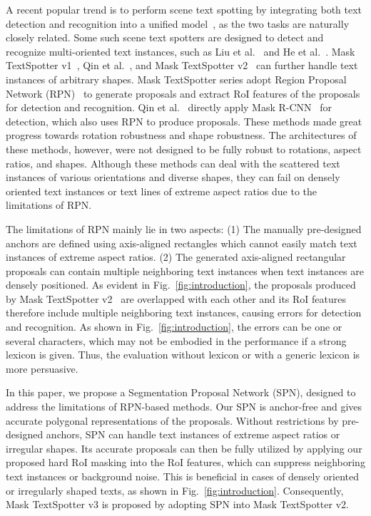 \documentclass[runningheads]{llncs}
\begin{document}
A recent popular trend is to perform scene text spotting by integrating both text detection and recognition into a unified model~\cite{Busta_2017_ICCV,Li_2017_ICCV}, as the two tasks are naturally closely related. Some such scene text spotters are designed to detect and recognize multi-oriented text instances, such as Liu et al.~\cite{liu2018fots} and He et al.~\cite{he2018end}. Mask TextSpotter v1~\cite{LyuLYWB18}, Qin et al.~\cite{qin2019towards}, and Mask TextSpotter v2~\cite{liao2019mask} can further handle text instances of arbitrary shapes. Mask TextSpotter series adopt Region Proposal Network (RPN)~\cite{ren2015faster} to generate proposals and extract RoI features of the proposals for detection and recognition. Qin et al.~\cite{qin2019towards} directly apply Mask R-CNN~\cite{he2017mask} for detection, which also uses RPN to produce proposals. 
These methods made great progress towards rotation robustness and shape robustness. The architectures of these methods, however, were not designed to be fully robust to rotations, aspect ratios, and shapes. Although these methods can deal with the scattered text instances of various orientations and diverse shapes, they can fail on densely oriented text instances or text lines of extreme aspect ratios due to the limitations of RPN.

The limitations of RPN mainly lie in two aspects: (1) The manually pre-designed anchors are defined using axis-aligned rectangles which cannot easily match text instances of extreme aspect ratios. (2) The generated axis-aligned rectangular proposals can contain multiple neighboring text instances when text instances are densely positioned.
As evident in Fig.~\ref{fig:introduction}, the proposals produced by Mask TextSpotter v2~\cite{liao2019mask} are overlapped with each other and its RoI features therefore include multiple neighboring text instances, causing errors for detection and recognition. As shown in Fig.~\ref{fig:introduction}, the errors can be one or several characters, which may not be embodied in the performance if a strong lexicon is given. Thus, the evaluation without lexicon or with a generic lexicon is more persuasive.

In this paper, we propose a Segmentation Proposal Network (SPN), designed to address the limitations of RPN-based methods. Our SPN is anchor-free and gives accurate polygonal representations of the proposals. Without restrictions by pre-designed anchors, SPN can handle text instances of extreme aspect ratios or irregular shapes. Its accurate proposals can then be fully utilized by applying our proposed hard RoI masking into the RoI features, which can suppress neighboring text instances or background noise. This is beneficial in cases of densely oriented or irregularly shaped texts, as shown in Fig.~\ref{fig:introduction}. Consequently, Mask TextSpotter v3 is proposed by adopting SPN into Mask TextSpotter v2.
\end{document}
